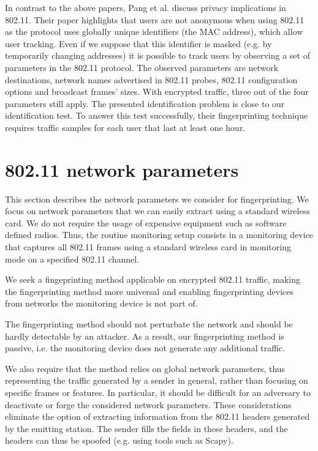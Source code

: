 \documentclass[10pt, conference, compsocconf, letterpaper]{IEEEtran}
\begin{document}
In contrast to the above papers, Pang et al. \cite{Pang:Mobicom} discuss privacy implications in 802.11. 
Their paper highlights that users are not anonymous when using 802.11 as the protocol uses globally 
unique identifiers (the MAC address), which allow user tracking. 
Even if we suppose that this identifier is masked (e.g. by temporarily changing addresses) 
it is possible to track users by observing a set 
of parameters in the 802.11 protocol. 
The observed parameters are network destinations, network names 
advertised in 802.11 probes, 802.11 configuration options and broadcast frames' sizes.  
With encrypted traffic, three out of the four parameters still apply. 
The presented identification problem is close to our identification test.
To answer this test successfully, their fingerprinting technique requires traffic 
samples for each user that last at least one hour.





\section{802.11 network parameters}
\label{sec:parameters}
This section describes the network parameters we consider for fingerprinting.
We focus on network parameters that we can easily extract using a standard wireless card. We do not require the usage of expensive equipment such as software defined radios. Thus, the routine monitoring setup consists in a monitoring device that captures all 802.11 frames using a standard wireless card in monitoring mode on a specified 802.11 channel. 



We seek a fingeprinting method applicable on encrypted 802.11 traffic, making the fingerprinting method more universal and enabling fingerprinting devices from networks the monitoring device is not part of.

The fingerprinting method should not perturbate the network and should be hardly detectable by an attacker. As a result, our fingerprinting method is passive, i.e. the monitoring device does not generate any additional traffic. 


We also require that the method relies on global network parameters, thus representing the traffic generated by a sender in general, rather than focusing on specific frames or features. In particular, it should be difficult for an adversary to deactivate or forge the considered network parameters. These considerations eliminate the option of extracting information from the 802.11 headers generated by the emitting station. The sender fills the fields in these headers, and the headers can thus be spoofed (e.g. using tools such as Scapy).
\end{document}
